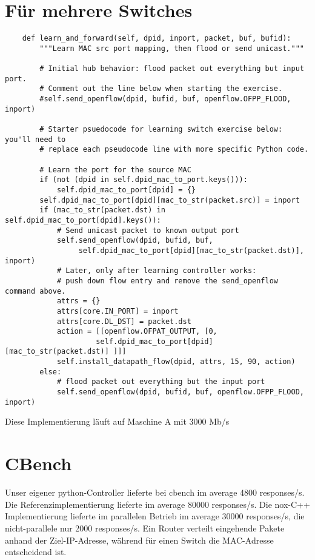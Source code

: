 \documentclass[a4paper,10pt]{scrartcl}
\begin{document}
\section*{Für mehrere Switches}
\begin{verbatim}
    def learn_and_forward(self, dpid, inport, packet, buf, bufid):
        """Learn MAC src port mapping, then flood or send unicast."""

        # Initial hub behavior: flood packet out everything but input port.
        # Comment out the line below when starting the exercise.
        #self.send_openflow(dpid, bufid, buf, openflow.OFPP_FLOOD, inport)

        # Starter psuedocode for learning switch exercise below: you'll need to
        # replace each pseudocode line with more specific Python code.

        # Learn the port for the source MAC
        if (not (dpid in self.dpid_mac_to_port.keys())):
            self.dpid_mac_to_port[dpid] = {}
        self.dpid_mac_to_port[dpid][mac_to_str(packet.src)] = inport
        if (mac_to_str(packet.dst) in self.dpid_mac_to_port[dpid].keys()):
            # Send unicast packet to known output port
            self.send_openflow(dpid, bufid, buf, 
                 self.dpid_mac_to_port[dpid][mac_to_str(packet.dst)], inport)
            # Later, only after learning controller works: 
            # push down flow entry and remove the send_openflow command above.
            attrs = {}
            attrs[core.IN_PORT] = inport
            attrs[core.DL_DST] = packet.dst
            action = [[openflow.OFPAT_OUTPUT, [0, 
                     self.dpid_mac_to_port[dpid][mac_to_str(packet.dst)] ]]]
            self.install_datapath_flow(dpid, attrs, 15, 90, action)
        else:
            # flood packet out everything but the input port
            self.send_openflow(dpid, bufid, buf, openflow.OFPP_FLOOD, inport)
\end{verbatim}
  Diese Implementierung läuft auf Maschine A mit 3000 Mb/s

\section*{CBench}
  Unser eigener python-Controller lieferte bei cbench im average 4800 responses/s. Die Referenzimplementierung lieferte im average 80000 responses/s. Die nox-C++ Implementierung lieferte im  parallelen Betrieb im average 30000 responses/s, die nicht-parallele nur 2000 responses/s.
  Ein Router verteilt eingehende Pakete anhand der Ziel-IP-Adresse, während für einen Switch die MAC-Adresse entscheidend ist.
\end{document}
